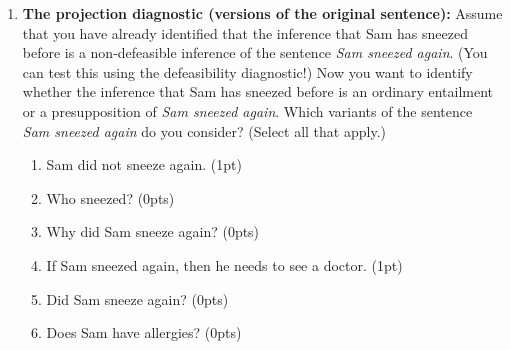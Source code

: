 \documentclass[a4,11pt]{article}
\begin{document}
\begin{enumerate}[leftmargin = 12pt]
\begin{enumerate}[noitemsep]
        \item We create versions of the sentence A: its negation, a polar question version and a conditional version. We then judge whether B is implied by these versions of A. If it is, then B is a presupposition. If it is not, then B is an ordinary entailment. (1pt)

\item We create versions of the inference B: its negation, a polar question version and a conditional version. We then judge whether these versions are implied by the sentence A. If they are, then B is a presupposition. If they are not, then B is an ordinary entailment. (0pts)

    \end{enumerate}

  {\bf Model answer:}  The correct answer is the one where we create versions of the sentence A, not the one where we create versions of the inference B. After all, we want to diagnose the status of the inference B relative to A: by creating entailment-canceling versions of A, we can assess whether the inference B is an ordinary entailment or a presupposition. 
 
 \item {\bf The projection diagnostic (versions of the original sentence):} Assume that you have already identified that the inference that Sam has sneezed before is a non-defeasible inference of the sentence {\em Sam sneezed again}. (You can test this using the defeasibility diagnostic!) Now you want to identify whether the inference that Sam has sneezed before is an ordinary entailment or a presupposition of {\em Sam sneezed again}. Which variants of the sentence {\em Sam sneezed again} do you consider? (Select all that apply.)
 
    \begin{enumerate}[noitemsep]
        \item Sam did not sneeze again. (1pt)
         \item Who sneezed? (0pts)
           \item Why did Sam sneeze again? (0pts)
           \item If Sam sneezed again, then he needs to see a doctor. (1pt)
           \item Did Sam sneeze again? (0pts)
           \item Does Sam have allergies? (0pts)
    \end{enumerate}
  

\end{enumerate}
\end{document}
